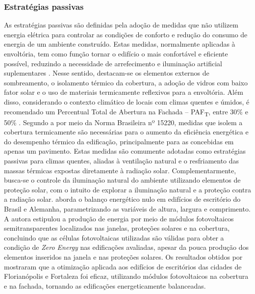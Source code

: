 \subsubsection{Estratégias passivas}
As estratégias passivas são definidas pela adoção de medidas que não utilizem energia elétrica para controlar as condições de conforto e redução do consumo de energia de um ambiente construído. Estas medidas, normalmente aplicadas à envoltória, tem como função tornar o edifício o mais confortável e eficiente possível, reduzindo a necessidade de arrefecimento e iluminação artificial suplementares \cite{AmericanSocietyofHeatingRefrigeratingandAir-ConditioningEngineers-ASHRAE2014,Athienitis2015,Hensen2012,U.S.DepartmentofEnergy-USDOE2011}.\vspace*{0.3cm} \newline
Nesse sentido, destacam-se os elementos externos de sombreamento, o isolamento térmico da cobertura, a adoção de vidros com baixo fator solar e o uso de materiais termicamente reflexivos para a envoltória. Além disso, considerando o contexto climático de locais com climas quentes e úmidos, é recomendado um Percentual Total de Abertura na Fachada – PAF\textsubscript{T}, entre 30\% e 50\% \cite{Didone2014a}.\vspace*{0.3cm} \newline
Segundo a \textcite{AssociacaoBrasileiradeNormasTecnicas-ABNT2003} por meio da Norma Brasileira nº 15220, medidas que isolem a cobertura termicamente são necessárias para o aumento da eficiência energética e do desempenho térmico da edificação, principalmente para as concebidas em apenas um pavimento. Estas medidas são comumente adotadas como estratégias passivas para climas quentes, aliadas à ventilação natural e o resfriamento das massas térmicas expostas diretamente à radiação solar. Complementarmente, busca-se o controle da iluminação natural do ambiente utilizando elementos de proteção solar, com o intuito de explorar a iluminação natural e a proteção contra a radiação solar.\vspace*{0.3cm} \newline
\textcite{Didone2014} aborda o balanço energético nulo em edifícios de escritório do Brasil e Alemanha, parametrizando as variáveis de altura, largura e comprimento. A autora estipulou a produção de energia por meio de módulos fotovoltaicos semitransparentes localizados nas janelas, proteções solares e na cobertura, concluindo que as células fotovoltaicas utilizadas são válidas para obter a condição de \textit{Zero Energy} nas edificações avaliadas, apesar da pouca produção dos elementos inseridos na janela e nas proteções solares. Os resultados obtidos por \textcite{Didone2014a} mostraram que a otimização aplicada aos edifícios de escritórios das cidades de Florianópolis e Fortaleza foi eficaz, utilizando módulos fotovoltaicos na cobertura e na fachada, tornando as edificações energeticamente balanceadas.\vspace*{0.3cm} \newline
